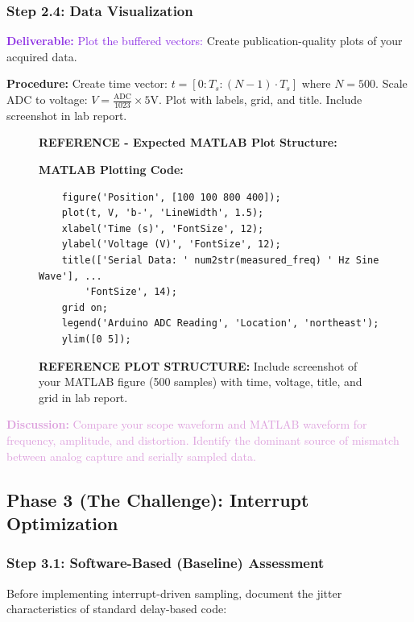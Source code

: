\documentclass[11pt,letterpaper]{article}
\providecommand{\disECE}[1]{\textcolor{Plum}{\textbf{Discussion:} #1}}
\providecommand{\delECE}[1]{\textcolor{BlueViolet}{\textbf{Deliverable:} #1}}
\begin{document}
\subsubsection{Step 2.4: Data Visualization}
\delECE{Plot the buffered vectors:} Create publication-quality plots of your acquired data.

\textbf{Procedure:}
Create time vector: $t = [0 : T_s : (N-1) \cdot T_s]$ where $N=500$. Scale ADC to voltage: $V = \frac{\text{ADC}}{1023} \times 5$V. Plot with labels, grid, and title. Include screenshot in lab report.

\begin{figure}[H]
    \centering
    \vspace{0.5in}
    \textbf{REFERENCE - Expected MATLAB Plot Structure:}
    
    \vspace{0.3in}
    \textbf{MATLAB Plotting Code:}
    \begin{verbatim}
    figure('Position', [100 100 800 400]);
    plot(t, V, 'b-', 'LineWidth', 1.5);
    xlabel('Time (s)', 'FontSize', 12);
    ylabel('Voltage (V)', 'FontSize', 12);
    title(['Serial Data: ' num2str(measured_freq) ' Hz Sine Wave'], ...
        'FontSize', 14);
    grid on;
    legend('Arduino ADC Reading', 'Location', 'northeast');
    ylim([0 5]);
    \end{verbatim}
    
    \vspace{0.3in}
    \caption{\textbf{REFERENCE PLOT STRUCTURE:} Include screenshot of your MATLAB figure (500 samples) with time, voltage, title, and grid in lab report.}
    \label{fig:matlab_plot}
\end{figure}

\disECE{Compare your scope waveform and MATLAB waveform for frequency, amplitude, and distortion. Identify the dominant source of mismatch between analog capture and serially sampled data.}

\clearpage

\subsection{Phase 3 (The Challenge): Interrupt Optimization}

\subsubsection{Step 3.1: Software-Based (Baseline) Assessment}
Before implementing interrupt-driven sampling, document the jitter characteristics of standard delay-based code:
\end{document}
